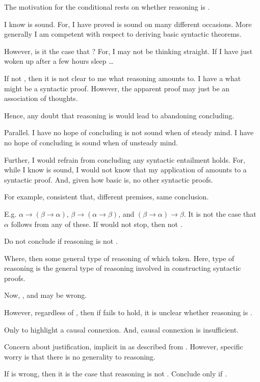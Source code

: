 \begin{note}
  The motivation for the conditional rests on whether reasoning is .

  I know \sqE{} is sound.
  For, I have proved \sqE{} is sound on many different occasions.
  More generally I am competent with respect to deriving basic syntactic theorems.

  However, is it the case that ?
  For, I may not be thinking straight.
  If I have just woken up after a few hours sleep \dots

  If not , then it is not clear to me what reasoning amounts to.
  I have a what might be a syntactic proof.
  However, the apparent proof may just be an association of thoughts.

  Hence, any doubt that reasoning is  would lead to abandoning concluding.

  Parallel.
  I have no hope of concluding \sqE{} is not sound when of steady mind.
  I have no hope of concluding \sqE{} is sound when of unsteady mind.

  Further, I would refrain from concluding any syntactic entailment holds.
  For, while I know \sqE{} is sound, I would not know that my application of \sqE{} amounts to a syntactic proof.
  And, given how basic \sqE{} is, no other syntactic proofs.

  For example, consistent that, different premises, same conclusion.

  E.g. \(\alpha \rightarrow (\beta \rightarrow \alpha)\), \(\beta \rightarrow (\alpha \rightarrow \beta)\), and \((\beta \rightarrow \alpha) \rightarrow \beta\).
  It is not the case that \(\alpha\) follows from any of these.
  If would not stop, then not .

  Do not conclude if reasoning is not .

  Where,  then some general type of reasoning of which token.
  Here, type of reasoning is the general type of reasoning involved in constructing syntactic proofs.
\end{note}

\begin{note}
  Now, , and  may be wrong.

  However, regardless of , then if \requ{} fails to hold, it is unclear whether reasoning is .

  Only to highlight a causal connexion.
  And, causal connexion is insufficient.

  Concern about justification, implicit in  as described from .
  However, specific worry is that there is no generality to reasoning.

  If  is wrong, then it is the case that reasoning is not .
  Conclude only if .
\end{note}

